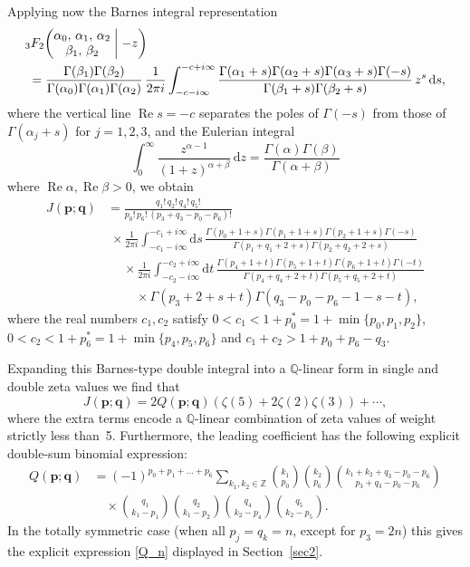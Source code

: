 \documentclass[12pt,reqno]{amsart}
\theoremstyle{remark}
\renewcommand{\d}{{\mathrm d}}
\renewcommand{\Re}{\operatorname{Re}}
\newcommand\bp{\boldsymbol p}
\newcommand\bq{\boldsymbol q}
\begin{document}
Applying now the Barnes integral representation
\begin{align*}
&
{}_3F_2\bigg( \begin{matrix} \alpha_0, \, \alpha_1, \, \alpha_2 \\ \beta_1, \, \beta_2 \end{matrix}\biggm|-z\bigg)
\\ &\;
=\frac{\Gamma(\beta_1)\Gamma(\beta_2)}{\Gamma(\alpha_0)\Gamma(\alpha_1)\Gamma(\alpha_2)}
\,\frac1{2\pi i}\int_{-c-i\infty}^{-c+i\infty}\frac{\Gamma(\alpha_1+s)\Gamma(\alpha_2+s)\Gamma(\alpha_3+s)\Gamma(-s)}{\Gamma(\beta_1+s)\Gamma(\beta_2+s)}\,z^s\,\d s,
\end{align*}
where the vertical line $\Re s=-c$ separates the poles of $\Gamma(-s)$ from those of $\Gamma(\alpha_j+s)$ for $j=1,2,3$,
and the Eulerian integral
\[
\int_0^\infty\frac{z^{\alpha-1}}{(1+z)^{\alpha+\beta}}\,\d z
=\frac{\Gamma(\alpha)\Gamma(\beta)}{\Gamma(\alpha+\beta)}
\]
where $\Re\alpha,\Re\beta>0$, we obtain
\begin{align}
J(\bp;\bq)&=\frac{q_1!\,q_2!\,q_4!\,q_5!}{p_0!\,p_6!\,(p_3+q_3-p_0-p_6)!}
\nonumber\\ &\;\times
\frac1{2\pi i}\int_{-c_1-i\infty}^{-c_1+i\infty}\d s
\,\frac{\Gamma(p_0+1+s)\Gamma(p_1+1+s)\Gamma(p_2+1+s)\Gamma(-s)}{\Gamma(p_1+q_1+2+s)\Gamma(p_2+q_2+2+s)}
\nonumber\\ &\;\quad\times
\frac1{2\pi i}\int_{-c_2-i\infty}^{-c_2+i\infty}\d t
\,\frac{\Gamma(p_4+1+t)\Gamma(p_5+1+t)\Gamma(p_6+1+t)\Gamma(-t)}{\Gamma(p_4+q_4+2+t)\Gamma(p_5+q_5+2+t)}
\nonumber\\ &\;\qquad\times
\Gamma(p_3+2+s+t)\Gamma(q_3-p_0-p_6-1-s-t),
\label{intJ}
\end{align}
where the  real numbers $c_1,c_2$ satisfy $0<c_1<1+p_0^*=1+\min\{p_0,p_1,p_2\}$, $0<c_2<1+p_6^*=1+\min\{p_4,p_5,p_6\}$ and $c_1+c_2>1+p_0+p_6-q_3$.

Expanding this Barnes-type double integral into a $\mathbb Q$-linear form in single and double zeta values we find that
\[
J(\bp;\bq)=2Q(\bp;\bq)(\zeta(5)+2\zeta(2)\zeta(3))+\dotsb,
\]
where the extra terms encode a $\mathbb Q$-linear combination of zeta values of weight  strictly less than~5.
Furthermore, the leading coefficient has the following explicit double-sum binomial expression:
\begin{align}
Q(\bp;\bq)
&=(-1)^{p_0+p_1+\dots+p_6}\sum_{k_1,k_2\in\mathbb Z}
\binom{k_1}{p_0}\binom{k_2}{p_6}\binom{k_1+k_2+q_3-p_0-p_6}{p_3+q_3-p_0-p_6}
\nonumber\\ &\quad\times
\binom{q_1}{k_1-p_1}\binom{q_2}{k_1-p_2}\binom{q_4}{k_2-p_4}\binom{q_5}{k_2-p_5}.
\label{sumQ}
\end{align}
In the totally symmetric case (when all $p_j=q_k=n$, except for $p_3=2n$) this gives the explicit expression \eqref{Q_n} displayed in Section~\ref{sec2}.
\end{document}
